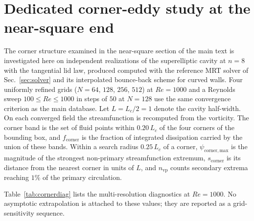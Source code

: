 \documentclass[11pt]{article}
\begin{document}
\section{Dedicated corner-eddy study at the near-square end}\label{sec:corner}

The corner structure examined in the near-square section of the main text is
investigated here on independent realizations of the superelliptic cavity at
$n=8$ with the tangential lid law, \color{revred}produced \color{revblue}computed\color{black} with the reference MRT solver of
Sec.~\ref{sec:solver} and its interpolated bounce-back scheme for curved walls.
Four uniformly refined grids ($N=64$, $128$, $256$, $512$) at $Re=1000$ and a
Reynolds sweep $100\le Re\le1000$ in steps of $50$ at $N=128$ use the same
convergence criterion as the main database. Let $L=L_c/2=1$ denote the cavity
half-width. On each converged field the streamfunction is recomputed from the
vorticity. The corner band is the set of fluid points within $0.20\,L_c$ of the
four corners of the bounding box, and $f_{\mathrm{corner}}$ is the fraction of
integrated dissipation carried by the union of these bands. Within a search
radius $0.25\,L_c$ of a corner, $\psi_{\mathrm{corner,max}}$ is the magnitude of
the strongest non-primary streamfunction extremum, $s_{\mathrm{corner}}$ is its
distance from the nearest corner in units of $L$, and $n_{\mathrm{vp}}$ counts
secondary extrema reaching $1\%$ of the primary circulation.

Table~\ref{tab:cornerdiag} lists the multi-resolution diagnostics at $Re=1000$.
No asymptotic extrapolation is attached to these values; they are reported as a
grid-sensitivity sequence.
\end{document}

